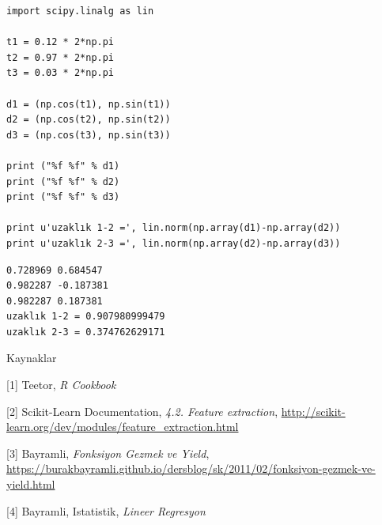 \documentclass[12pt,fleqn]{article}\usepackage{../../common}
\begin{document}
\begin{verbatim}
import scipy.linalg as lin

t1 = 0.12 * 2*np.pi
t2 = 0.97 * 2*np.pi
t3 = 0.03 * 2*np.pi

d1 = (np.cos(t1), np.sin(t1))
d2 = (np.cos(t2), np.sin(t2))
d3 = (np.cos(t3), np.sin(t3))

print ("%f %f" % d1)
print ("%f %f" % d2)
print ("%f %f" % d3)

print u'uzaklık 1-2 =', lin.norm(np.array(d1)-np.array(d2))
print u'uzaklık 2-3 =', lin.norm(np.array(d2)-np.array(d3))
\end{verbatim}

\begin{verbatim}
0.728969 0.684547
0.982287 -0.187381
0.982287 0.187381
uzaklık 1-2 = 0.907980999479
uzaklık 2-3 = 0.374762629171
\end{verbatim}

Kaynaklar 

[1] Teetor, {\em R Cookbook}

[2] Scikit-Learn Documentation, {\em 4.2. Feature extraction}, \url{http://scikit-learn.org/dev/modules/feature_extraction.html}

[3] Bayramli, 
    {\em Fonksiyon Gezmek ve Yield}, 
    \url{https://burakbayramli.github.io/dersblog/sk/2011/02/fonksiyon-gezmek-ve-yield.html}

[4] Bayramli, Istatistik, {\em Lineer Regresyon}
\end{document}
